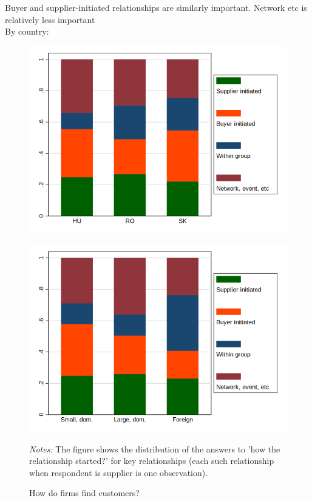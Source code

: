 \documentclass[final, dvipsnames, authoryear,12pt]{elsarticle}
\begin{document}
Buyer and supplier-initiated relationships are similarly important. Network etc is relatively less important\\
By country:

\begin{figure}[h]    
    \begin{center}
    \label{fig:rel_form}    
    \caption{How do firms find customers?}  
    \begin{subfloat}[By country]
    {\includegraphics[scale=0.5]{graphs/Table6a.png}}
    \end{subfloat}
    \begin{subfloat}
    {\includegraphics[scale=0.5]{graphs/Table6b.png}}
    \end{subfloat}
    \end{center}
    {\footnotesize \textit{Notes:} The figure shows the distribution of the answers to ’how the relationship started?’ for key relationships (each such relationship when respondent is supplier is one observation).}     
\end{figure}
\end{document}
